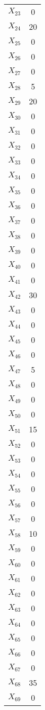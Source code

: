 \documentclass[a4paper,10pt]{article}
\begin{document}
\begin{center}
\begin{longtable}{cc}
$X_{23}$ & 0 \\
$X_{24}$ & 20 \\
$X_{25}$ & 0 \\
$X_{26}$ & 0 \\
$X_{27}$ & 0 \\
$X_{28}$ & 5 \\
$X_{29}$ & 20 \\
$X_{30}$ & 0 \\
$X_{31}$ & 0 \\
$X_{32}$ & 0 \\
$X_{33}$ & 0 \\
$X_{34}$ & 0 \\
$X_{35}$ & 0 \\
$X_{36}$ & 0 \\
$X_{37}$ & 0 \\
$X_{38}$ & 0 \\
$X_{39}$ & 0 \\
$X_{40}$ & 0 \\
$X_{41}$ & 0 \\
$X_{42}$ & 30 \\
$X_{43}$ & 0 \\
$X_{44}$ & 0 \\
$X_{45}$ & 0 \\
$X_{46}$ & 0 \\
$X_{47}$ & 5 \\
$X_{48}$ & 0 \\
$X_{49}$ & 0 \\
$X_{50}$ & 0 \\
$X_{51}$ & 15 \\
$X_{52}$ & 0 \\
$X_{53}$ & 0 \\
$X_{54}$ & 0 \\
$X_{55}$ & 0 \\
$X_{56}$ & 0 \\
$X_{57}$ & 0 \\
$X_{58}$ & 10 \\
$X_{59}$ & 0 \\
$X_{60}$ & 0 \\
$X_{61}$ & 0 \\
$X_{62}$ & 0 \\
$X_{63}$ & 0 \\
$X_{64}$ & 0 \\
$X_{65}$ & 0 \\
$X_{66}$ & 0 \\
$X_{67}$ & 0 \\
$X_{68}$ & 35 \\
$X_{69}$ & 0 \\

\end{longtable}
\end{center}
\end{document}
